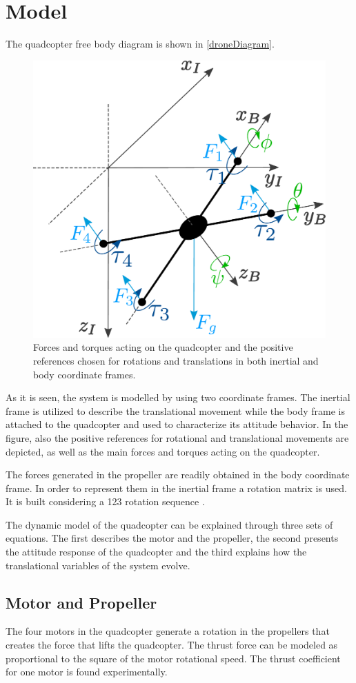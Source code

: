 \section{Model}
The quadcopter free body diagram is shown in \autoref{droneDiagram}. 
\begin{figure}[H]
	\centering
	\includegraphics[width=.4\textwidth]{figures/droneDiagram}
	\caption{Forces and torques acting on the quadcopter and the positive references chosen for rotations and translations in both inertial and body coordinate frames.}
	\label{droneDiagram}
\end{figure}
%
As it is seen, the system is modelled by using two coordinate frames. The inertial frame is utilized to describe the translational movement while the body frame is attached to the quadcopter and used to characterize its attitude behavior. In the figure, also the positive references for rotational and translational movements are depicted, as well as the main forces and torques acting on the quadcopter. 

The forces generated in the propeller are readily obtained in the body coordinate frame. In order to represent them in the inertial frame a rotation matrix is used. It is built considering a 123 rotation sequence \cite{rotationmatrix}.
 
The dynamic model of the quadcopter can be explained through three sets of equations. The first describes the motor and the propeller, the second presents the attitude response of the quadcopter and the third explains how the translational variables of the system evolve.

\subsection{Motor and Propeller}
The four motors in the quadcopter generate a rotation in the propellers that creates the force that lifts the quadcopter. The thrust force can be modeled as proportional to the square of the motor rotational speed. The thrust coefficient for one motor is found experimentally. 
 
